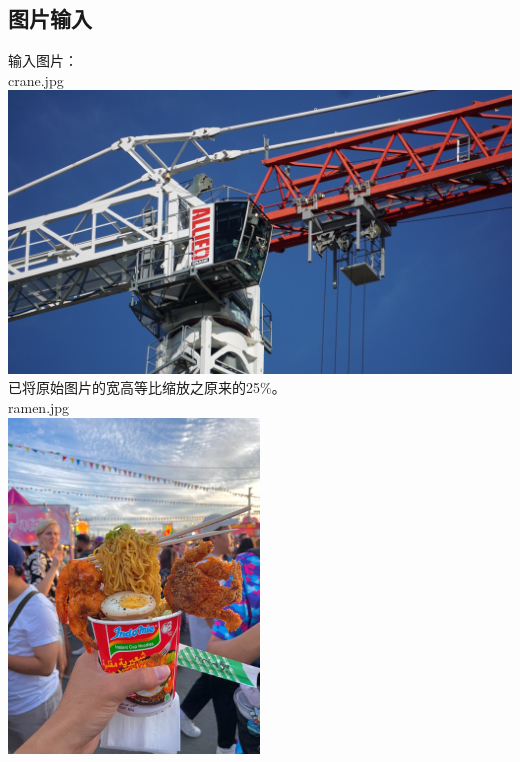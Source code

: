 \documentclass{article}
\begin{document}
\subsection{图片输入}
输入图片：\\
crane.jpg \\
\includegraphics[width=1.0\textwidth]{../python/crane.jpg}\\
已将原始图片的宽高等比缩放之原来的25\%。\\
ramen.jpg \\
\includegraphics[width=0.5\textwidth]{../python/ramen.jpg}\\
\end{document}
